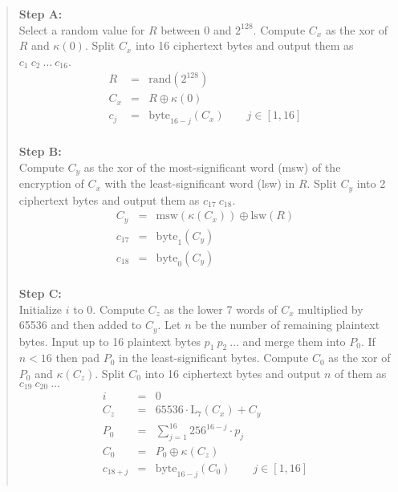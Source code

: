 \documentclass{article}
\newcommand{\xbyte}{\mathrm{byte}}
\begin{document}
\begin{quote}
\textbf{Step A:}\\
Select a random value for $R$ between 0 and $2^{128}$.
Compute $C_x$ as the xor of $R$ and $\kappa(0)$.
Split $C_x$ into 16 ciphertext bytes and output them as $c_{1}\ c_{2}\ \ldots\ c_{16}$.
\begin{eqnarray*}
  R &=& \mathrm{rand}(2^{128}) \\
  C_x &=& R \oplus \kappa(0) \\
  c_j &=& \xbyte_{16-j}(C_x) \qquad j \in [1,16] \\
\end{eqnarray*}

\textbf{Step B:}\\
Compute $C_y$ as the xor of the most-significant word (msw) 
of the encryption of $C_x$ with the least-significant word (lsw) in $R$.
Split $C_y$ into 2 ciphertext bytes and output them as $c_{17}\ c_{18}$.
\begin{eqnarray*}
  C_y &=& \mathrm{msw}(\kappa(C_x)) \oplus \mathrm{lsw}(R) \\
  c_{17} &=& \xbyte_{1}(C_y) \\
  c_{18} &=& \xbyte_{0}(C_y) \\
\end{eqnarray*}

\textbf{Step C:}\\
Initialize $i$ to 0.
Compute $C_z$ as the lower 7 words of $C_x$ multiplied by 65536 and then added to $C_y$.
Let $n$ be the number of remaining plaintext bytes.
Input up to 16 plaintext bytes $p_{1}\ p_{2}\ \ldots$ and merge them into $P_0$.
If $n<16$ then pad $P_0$ in the least-significant bytes.
Compute $C_0$ as the xor of $P_0$ and $\kappa(C_z)$.
Split $C_0$ into 16 ciphertext bytes and output $n$ of them as $c_{19}\ c_{20}\ \ldots$
\begin{eqnarray*}
  i &=& 0 \\
  C_z &=& 65536 \cdot \mathrm{L}_7(C_x) + C_y  \\
  P_0 &=& \sum_{j=1}^{16} 256^{16-j} \cdot p_{j} \\
  C_0 &=& P_0 \oplus \kappa(C_z) \\
  c_{18+j} &=& \xbyte_{16-j}(C_0) \qquad j \in [1,16] \\
\end{eqnarray*}


\end{quote}
\end{document}
